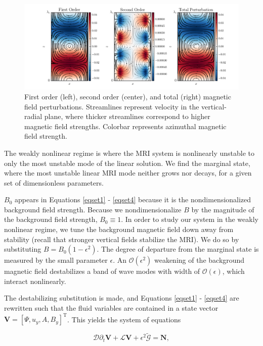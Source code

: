 \documentclass{emulateapj}
\newcommand{\beq}{\begin{equation}}
\newcommand{\eeq}{\end{equation}}
\begin{document}
\begin{figure}
\centering
\includegraphics[width=\textwidth]{../figures/thingap_streamfuncs_Bfield_Pm_1E-3.png}
\caption{First order (left), second order (center), and total (right) magnetic field perturbations. Streamlines represent velocity in the vertical-radial plane, where thicker streamlines correspond to higher magnetic field strengths. Colorbar represents azimuthal magnetic field strength.}\label{allorders_Bfield}
\end{figure}

The weakly nonlinear regime is where the MRI system is nonlinearly unstable to only the most unstable mode of the linear solution. We find the marginal state, where the most unstable linear MRI mode neither grows nor decays, for a given set of dimensionless parameters. 

$B_0$ appears in Equations \ref{eqset1} - \ref{eqset4} because it is the nondimensionalized background field strength. Because we nondimensionalize $B$ by the magnitude of the background field strength, $B_0 \equiv 1$. In order to study our system in the weakly nonlinear regime, we tune the background magnetic field down away from stability (recall that stronger vertical fields stabilize the MRI). We do so by substituting $B = B_0\left(1 - \epsilon^2\right)$. The degree of departure from the marginal state is measured by the small parameter $\epsilon$. An $\mathcal{O}\left(\epsilon^2\right)$ weakening of the background magnetic field destabilizes a band of wave modes with width of $\mathcal{O}\left(\epsilon\right)$, which interact nonlinearly.

The destabilizing substitution is made, and Equations \ref{eqset1} - \ref{eqset4} are rewritten such that the fluid variables are contained in a state vector $\mathbf{V} = \left[\Psi, u_y, A, B_y\right]^\mathrm{T}$. This yields the system of equations

\beq
\label{eq:unperturbed_matrix_equations}
 \mathcal{D}\partial_t \mathbf{V} +  \mathcal{L} \mathbf{V} + \epsilon^2\widetilde{\mathcal{G}} = \mathbf{N},
\eeq
\end{document}
